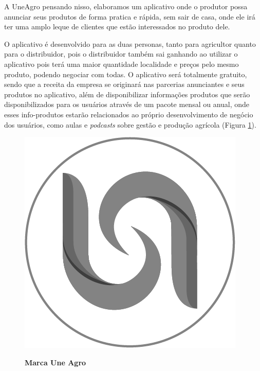 A UneAgro pensando nisso, elaboramos um aplicativo onde o produtor possa anunciar seus produtos de forma pratica e rápida, sem sair de casa, onde ele irá ter uma amplo leque de clientes que estão interessados no produto dele.

O aplicativo é desenvolvido para as duas personas, tanto para agricultor quanto para o distribuidor, pois o distribuidor também sai ganhando ao utilizar o aplicativo pois terá uma maior quantidade localidade e preços pelo mesmo produto, podendo negociar com todas. O aplicativo será totalmente gratuito, sendo que a receita da empresa se originará nas parcerias anunciantes e seus produtos no aplicativo, além de disponibilizar informações produtos que serão disponibilizados para os usuários através de um pacote mensal ou anual, onde esses info-produtos estarão relacionados ao próprio desenvolvimento de negócio dos usuários, como aulas e \textit{podcasts} sobre gestão e produção agrícola (Figura \ref{figura_28}).

\begin{figure}[H]
\centering
\caption{\textbf{Marca Une Agro}}
\includegraphics[scale=1.5]{Imagens/uneagro.png}
\label{figura_28}
\end{figure}


